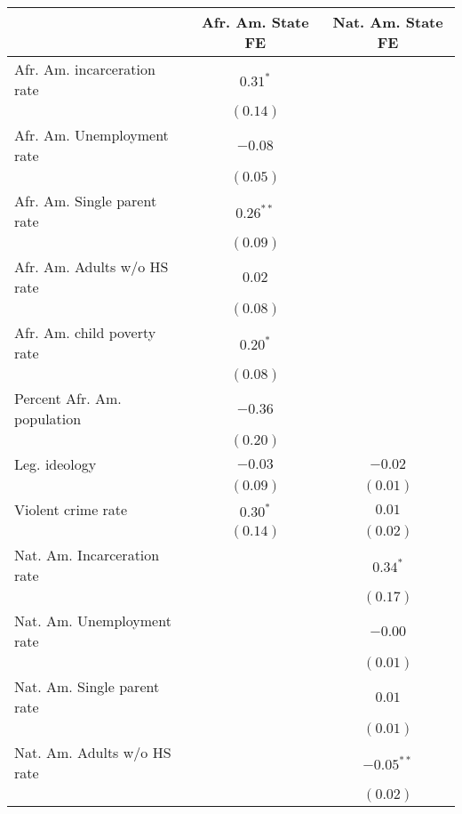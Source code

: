 
\begin{table}
\begin{center}
\begin{tabular}{l c c }
\hline
 & Afr. Am. State FE & Nat. Am. State FE \\
\hline
Afr. Am. incarceration rate & $0.31^{*}$  &               \\
                            & $(0.14)$    &               \\
Afr. Am. Unemployment rate  & $-0.08$     &               \\
                            & $(0.05)$    &               \\
Afr. Am. Single parent rate & $0.26^{**}$ &               \\
                            & $(0.09)$    &               \\
Afr. Am. Adults w/o HS rate & $0.02$      &               \\
                            & $(0.08)$    &               \\
Afr. Am. child poverty rate & $0.20^{*}$  &               \\
                            & $(0.08)$    &               \\
Percent Afr. Am. population & $-0.36$     &               \\
                            & $(0.20)$    &               \\
Leg. ideology               & $-0.03$     & $-0.02$       \\
                            & $(0.09)$    & $(0.01)$      \\
Violent crime rate          & $0.30^{*}$  & $0.01$        \\
                            & $(0.14)$    & $(0.02)$      \\
Nat. Am. Incarceration rate &             & $0.34^{*}$    \\
                            &             & $(0.17)$      \\
Nat. Am. Unemployment rate  &             & $-0.00$       \\
                            &             & $(0.01)$      \\
Nat. Am. Single parent rate &             & $0.01$        \\
                            &             & $(0.01)$      \\
Nat. Am. Adults w/o HS rate &             & $-0.05^{**}$  \\
                            &             & $(0.02)$      \\

\end{tabular}
\end{center}
\end{table}
